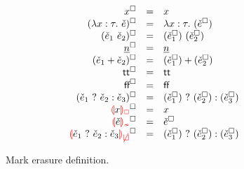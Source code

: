 \begin{figure}[htbp]
  \newcommand{\erasesToRow}[2]{\erase{#1} & = & #2}
  \[\begin{array}{rcl}
    \erasesToRow{x}{x} \\
    \erasesToRow{(\ECLam{x}{\TMV}{\ECMV})}{\ELam{x}{\TMV}{(\erase{\ECMV})}} \\
    \erasesToRow{(\ECAp{\ECMV_1}{\ECMV_2})}{\EAp{(\erase{\ECMV_1})}{(\erase{\ECMV_2})}} \\
    \erasesToRow{\ECNumMV}{\ENumMV} \\
    \erasesToRow{(\ECPlus{\ECMV_1}{\ECMV_2})}{\EPlus{(\erase{\ECMV_1})}{(\erase{\ECMV_2})}} \\
    \erasesToRow{\ECTrue}{\ETrue} \\
    \erasesToRow{\ECFalse}{\EFalse} \\
    \erasesToRow{(\ECIf{\ECMV_1}{\ECMV_2}{\ECMV_3})}{\EIf{(\erase{\ECMV_1})}{(\erase{\ECMV_2})}{(\erase{\ECMV_3})}} \\
    \erasesToRow{\ECUnbound{x}}{x} \\
    \erasesToRow{\ECInconType{\ECMV}}{\erase{\ECMV}} \\
    \erasesToRow{\ECInconBr{\ECMV_1}{\ECMV_2}{\ECMV_3}}{\EIf{(\erase{\ECMV_1})}{(\erase{\ECMV_2})}{(\erase{\ECMV_3})}} \\
  \end{array}\]
  \caption{Mark erasure definition.}
  \label{fig:calculus-mark-erasure}
\end{figure}
